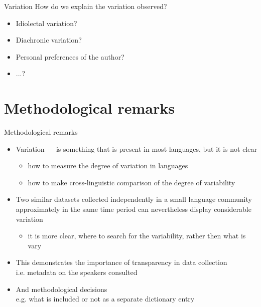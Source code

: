 \begin{frame}{Variation}
How do we explain the variation observed?
\begin{itemize}
    \item Idiolectal variation?
    \item Diachronic variation?
    \item Personal preferences of the author?
    \item ...?
\end{itemize}
\end{frame}

\section{Methodological remarks}
\begin{frame}{Methodological remarks}

\begin{itemize}
    \item Variation --- is something that is present in most languages, but it is not clear
    \begin{itemize}
        \item how to measure the degree of variation in languages
        \item how to make cross-linguistic comparison of the degree of
variability \pause
    \end{itemize}
    \item Two similar datasets collected independently in a small language community approximately in the same time period can nevertheless display considerable variation
    \begin{itemize}
        \item it is more clear, where to search for the variability, rather then what is vary
    \end{itemize} 
    \item This demonstrates the importance of transparency in data collection \\ i.e. metadata on the speakers consulted
    \item And methodological decisions \\ e.g. what is included or not as a separate dictionary entry
\end{itemize}

\end{frame}


